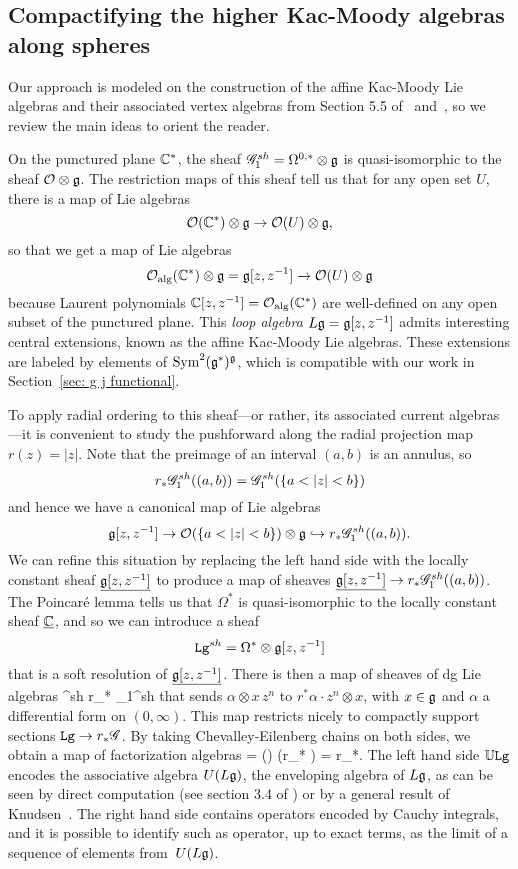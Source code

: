 \subsection{Compactifying the higher Kac-Moody algebras along spheres}

Our approach is modeled on the construction of the affine Kac-Moody Lie algebras and their associated vertex algebras from Section 5.5 of~\cite{CG1} and~\cite{OGthesis},
so we review the main ideas to orient the reader.

On the punctured plane $\mathbb C^*$, the sheaf $
\mathscr G_1^{sh} = \Omega^{0,*} \otimes \mathfrak g$ is quasi-isomorphic to the sheaf $\mathcal O \otimes \mathfrak g$.
The restriction maps of this sheaf tell us that for any open set $U$, there is a map of Lie algebras
\[
\mathcal O(\mathbb C^*) \otimes \mathfrak g \to \mathcal O(U) \otimes \mathfrak g,
\]
so that we get a map of Lie algebras
\[
\mathcal O_{\rm alg}(\mathbb C^*) \otimes \mathfrak g = \mathfrak g[z,z^{-1}] \to  \mathcal O(U) \otimes \mathfrak g
\]
because Laurent polynomials $\mathbb C[z,z^{-1}] = \mathcal O_{\rm alg}(\mathbb C^*)$ are well-defined on any open subset of the punctured plane.
This {\em loop algebra} $L\mathfrak g = \mathfrak g[z,z^{-1}]$ admits interesting central extensions,
known as the affine Kac-Moody Lie algebras.
These extensions are labeled by elements of ${\rm Sym}^2(\mathfrak g^*)^\mathfrak g$, 
which is compatible with our work in Section~\ref{sec: g j functional}.

To apply radial ordering to this sheaf---or rather, its associated current algebras---it is convenient to study the pushforward along the radial projection map $r(z) = |z|$.
Note that the preimage of an interval $(a,b)$ is an annulus, so
\[
r_* \mathscr G_1^{sh}((a,b)) = \mathscr G_1^{sh}(\{a < |z| < b\})
\]
and hence we have a canonical map of Lie algebras
\[
\mathfrak g[z,z^{-1}] \to \mathcal O(\{a < |z| < b\}) \otimes \mathfrak g \hookrightarrow r_* \mathscr G_1^{sh}((a,b)).
\]
We can refine this situation by replacing the left hand side with the locally constant sheaf $\underline{\mathfrak g[z,z^{-1}]}$ to produce a map of sheaves $\underline{\mathfrak g[z,z^{-1}]} \to  r_* \mathscr G_1^{sh}((a,b))$.
The Poincar\'e lemma tells us that $\Omega^*$ is quasi-isomorphic to the locally constant sheaf $\underline{\mathbb C}$,
and so we can introduce a sheaf
\[
\mathtt{Lg}^{sh} = \Omega^* \otimes \mathfrak g[z,z^{-1}]
\]
that is a soft resolution of $\underline{\mathfrak g[z,z^{-1}]}$.
There is then a map of sheaves of dg Lie algebras
\beqn
\label{eqn:looptolinearcurrent}
^{sh} \to r_* \sG_1^{sh}
\eeqn
that sends $\alpha \otimes x\, z^n$ to $r^*\alpha \cdot z^n \otimes x$, with $x \in \mathfrak g$ and $\alpha$ a differential form on $(0,\infty)$.
This map restricts nicely to compactly support sections $\mathtt{Lg} \to r_* \mathscr G$.
By taking Chevalley-Eilenberg chains on both sides, we obtain a map of factorization algebras
\beqn
\label{eqn:Uoflooptolinearcurrent}
\UU{} = \cliel() \to \cliel(r_* \sG) = r_*\UU\sG.
\eeqn
The left hand side $\mathbb U\mathtt{Lg}$ encodes the associative algebra $U(L\mathfrak g)$, the enveloping algebra of $L\mathfrak g$,
as can be seen by direct computation (see section 3.4 of \cite{CG1}) or by a general result of Knudsen~\cite{Knudsen}.
The right hand side contains operators encoded by Cauchy integrals, 
and it is possible to identify such as operator, up to exact terms, as the limit of a sequence of elements from~$U(L\mathfrak g)$.

